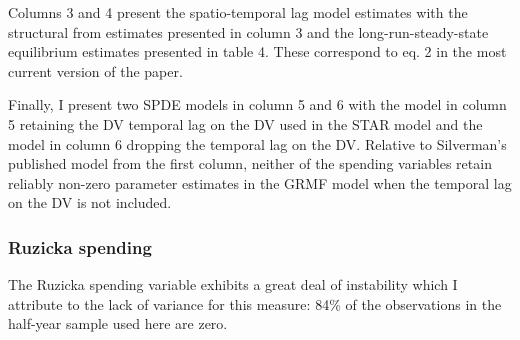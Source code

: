 \documentclass[
  12pt,
]{article}
\begin{document}
Columns 3 and 4 present the spatio-temporal lag model estimates with the structural from estimates presented in column 3 and the long-run-steady-state equilibrium estimates presented in table 4. These correspond to eq. 2 in the most current version of the paper.

Finally, I present two SPDE models in column 5 and 6 with the model in column 5 retaining the DV temporal lag on the DV used in the STAR model and the model in column 6 dropping the temporal lag on the DV. Relative to Silverman's published model from the first column, neither of the spending variables retain reliably non-zero parameter estimates in the GRMF model when the temporal lag on the DV is not included.

\hypertarget{ruzicka-spending}{%
\subsubsection{Ruzicka spending}\label{ruzicka-spending}}

The Ruzicka spending variable exhibits a great deal of instability which I attribute to the lack of variance for this measure: 84\% of the observations in the half-year sample used here are zero.
\end{document}
